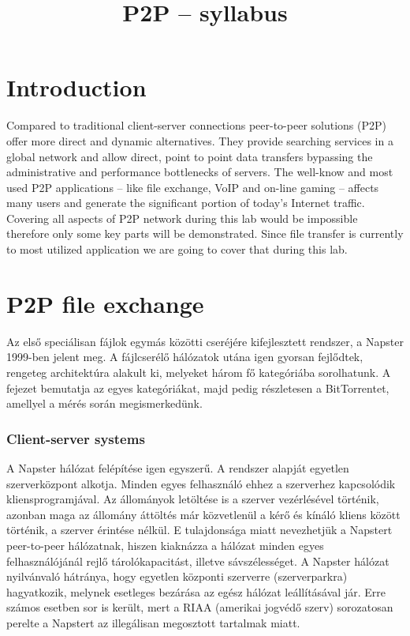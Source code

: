 \documentclass[a4paper]{article}
\title{P2P – syllabus}
\author{}
\date{}
\begin{document}
\maketitle

\tableofcontents

\section{Introduction}

Compared to traditional client-server connections peer-to-peer solutions (P2P) offer more direct and dynamic alternatives. They provide searching services in a global network and allow direct, point to point data transfers bypassing the administrative and performance bottlenecks of servers.
The well-know and most used P2P applications -- like file exchange, VoIP and on-line gaming -- affects many users and generate the significant portion of today's Internet traffic. Covering all aspects of P2P network during this lab would be impossible therefore only some key parts will be demonstrated. Since file transfer is currently to most utilized application we are going to cover that during this lab.

\section{P2P file exchange}

Az első speciálisan fájlok egymás közötti cseréjére kifejlesztett rendszer, a Napster 1999-ben jelent meg. A fájlcserélő hálózatok utána igen gyorsan fejlődtek, rengeteg architektúra alakult ki, melyeket három fő kategóriába sorolhatunk. A fejezet bemutatja az egyes kategóriákat, majd pedig részletesen a BitTorrentet, amellyel a mérés során megismerkedünk. 

\subsubsection{Client-server systems}

A Napster hálózat felépítése igen egyszerű. A rendszer alapját egyetlen szerverközpont alkotja. Minden egyes felhasználó ehhez a szerverhez kapcsolódik kliensprogramjával. Az állományok letöltése is a szerver vezérlésével történik, azonban maga az állomány áttöltés már közvetlenül a kérő és kínáló kliens között történik, a szerver érintése nélkül. E tulajdonsága miatt nevezhetjük a Napstert peer-to-peer hálózatnak, hiszen kiaknázza a hálózat minden egyes felhasználójánál rejlő tárolókapacitást, illetve sávszélességet. A Napster hálózat nyilvánvaló hátránya, hogy egyetlen központi szerverre (szerverparkra) hagyatkozik, melynek esetleges bezárása az egész hálózat leállításával jár. Erre számos esetben sor is került, mert a RIAA (amerikai jogvédő szerv) sorozatosan perelte a Napstert az illegálisan megosztott tartalmak miatt.
\end{document}
